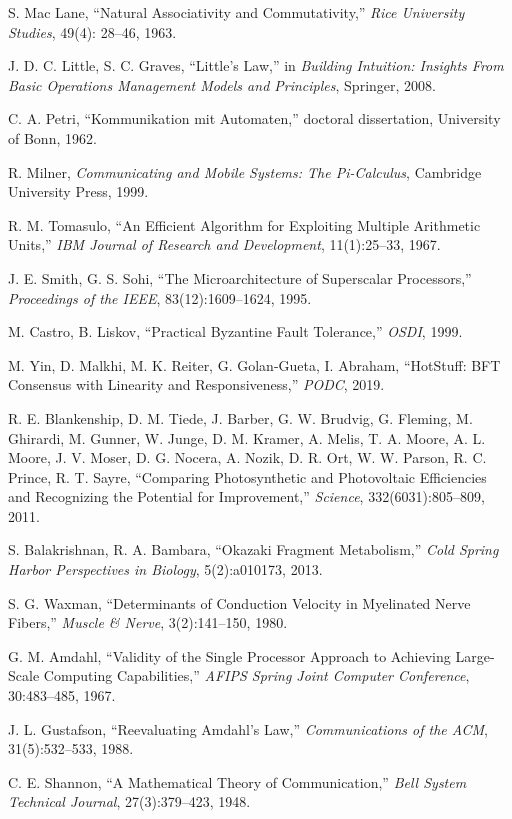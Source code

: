 \documentclass[
]{article}
\begin{document}
S. Mac Lane, ``Natural Associativity and Commutativity,'' \emph{Rice
University Studies}, 49(4): 28--46, 1963.

J. D. C. Little, S. C. Graves, ``Little's Law,'' in \emph{Building
Intuition: Insights From Basic Operations Management Models and
Principles}, Springer, 2008.

C. A. Petri, ``Kommunikation mit Automaten,'' doctoral dissertation,
University of Bonn, 1962.

R. Milner, \emph{Communicating and Mobile Systems: The Pi-Calculus},
Cambridge University Press, 1999.

R. M. Tomasulo, ``An Efficient Algorithm for Exploiting Multiple
Arithmetic Units,'' \emph{IBM Journal of Research and Development},
11(1):25--33, 1967.

J. E. Smith, G. S. Sohi, ``The Microarchitecture of Superscalar
Processors,'' \emph{Proceedings of the IEEE}, 83(12):1609--1624, 1995.

M. Castro, B. Liskov, ``Practical Byzantine Fault Tolerance,''
\emph{OSDI}, 1999.

M. Yin, D. Malkhi, M. K. Reiter, G. Golan-Gueta, I. Abraham, ``HotStuff:
BFT Consensus with Linearity and Responsiveness,'' \emph{PODC}, 2019.

R. E. Blankenship, D. M. Tiede, J. Barber, G. W. Brudvig, G. Fleming, M.
Ghirardi, M. Gunner, W. Junge, D. M. Kramer, A. Melis, T. A. Moore, A.
L. Moore, J. V. Moser, D. G. Nocera, A. Nozik, D. R. Ort, W. W. Parson,
R. C. Prince, R. T. Sayre, ``Comparing Photosynthetic and Photovoltaic
Efficiencies and Recognizing the Potential for Improvement,''
\emph{Science}, 332(6031):805--809, 2011.

S. Balakrishnan, R. A. Bambara, ``Okazaki Fragment Metabolism,''
\emph{Cold Spring Harbor Perspectives in Biology}, 5(2):a010173, 2013.

S. G. Waxman, ``Determinants of Conduction Velocity in Myelinated Nerve
Fibers,'' \emph{Muscle \& Nerve}, 3(2):141--150, 1980.

G. M. Amdahl, ``Validity of the Single Processor Approach to Achieving
Large-Scale Computing Capabilities,'' \emph{AFIPS Spring Joint Computer
Conference}, 30:483--485, 1967.

J. L. Gustafson, ``Reevaluating Amdahl's Law,'' \emph{Communications of
the ACM}, 31(5):532--533, 1988.

C. E. Shannon, ``A Mathematical Theory of Communication,'' \emph{Bell
System Technical Journal}, 27(3):379--423, 1948.
\end{document}

